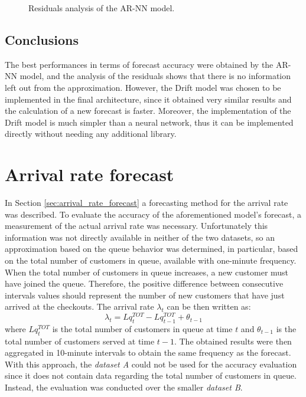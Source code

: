 \begin{figure}
  \begin{center}
  \end{center}
  \caption{Residuals analysis of the AR-NN model.}
  \label{fig:inflow_rate_forecast_residuals}
\end{figure}

\subsection{Conclusions}
The best performances in terms of forecast accuracy were obtained by the AR-NN model, and the analysis of the residuals shows that there is no information left out from the approximation. However, the Drift model was chosen to be implemented in the final architecture, since it obtained very similar results and the calculation of a new forecast is faster. Moreover, the implementation of the Drift model is much simpler than a neural network, thus it can be implemented directly without needing any additional library.

\section{Arrival rate forecast}
\label{sec:arrival_rate_forecast_results}

In Section \ref{sec:arrival_rate_forecast} a forecasting method for the arrival rate was described. To evaluate the accuracy of the aforementioned model’s forecast, a measurement of the actual arrival rate was necessary. Unfortunately this information was not directly available in neither of the two datasets, so an approximation based on the queue behavior was determined, in particular, based on the total number of customers in queue, available with one-minute frequency. When the total number of customers in queue increases, a new customer must have joined the queue. Therefore, the positive difference between consecutive intervals values should represent the number of new customers that have just arrived at the checkouts. The arrival rate \( \lambda_t \) can be then written as:
\begin{equation}
  \lambda_t = Lq_t^{TOT} - Lq_{t-1}^{TOT} + \theta_{t-1}
\end{equation}
where \( Lq_t^{TOT} \) is the total number of customers in queue at time \( t \) and \( \theta_{t-1} \) is the total number of customers served at time \( t-1 \). The obtained results were then aggregated in 10-minute intervals to obtain the same frequency as the forecast. With this approach, the \emph{dataset A} could not be used for the accuracy evaluation since it does not contain data regarding the total number of customers in queue. Instead, the evaluation was conducted over the smaller \emph{dataset B}.

